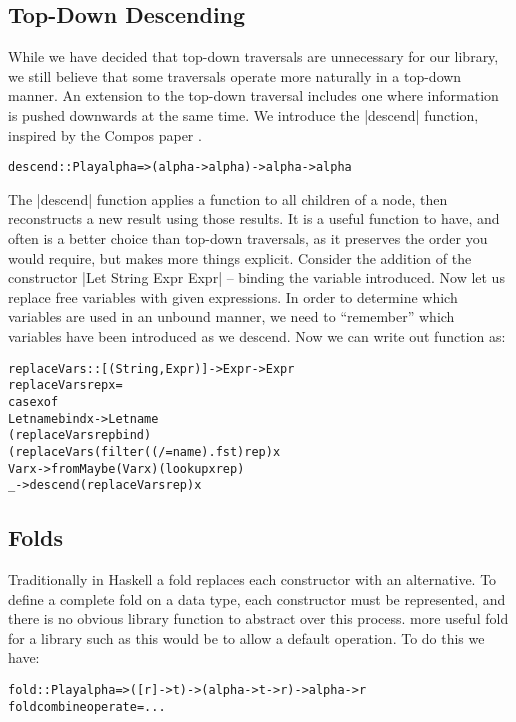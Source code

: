 \documentclass[preprint]{sigplanconf}
\newenvironment{code}{\begin{alltt}\small}{\end{alltt}}
\begin{document}
\subsection{Top-Down Descending}

While we have decided that top-down traversals are unnecessary for our library, we still believe that some traversals operate more naturally in a top-down manner. An extension to the top-down traversal includes one where information is pushed downwards at the same time. We introduce the |descend| function, inspired by the Compos paper \cite{compos}.

\begin{code}
descend :: Play alpha => (alpha -> alpha) -> alpha -> alpha
\end{code}

The |descend| function applies a function to all children of a node, then reconstructs a new result using those results. It is a useful function to have, and often is a better choice than top-down traversals, as it preserves the order you would require, but makes more things explicit. 
Consider the addition of the constructor |Let String Expr Expr| -- binding the variable introduced. Now let us replace free variables with given expressions. In order to determine which variables are used in an unbound manner, we need to ``remember'' which variables have been introduced as we descend. Now we can write out function as:

\begin{code}
replaceVars :: [(String,Expr)] -> Expr -> Expr
replaceVars rep x =
    case  x of
          Let name bind x -> Let name
              (replaceVars rep bind)
              (replaceVars (filter ((/= name) . fst) rep) x
          Var x -> fromMaybe (Var x) (lookup x rep)
          _ -> descend (replaceVars rep) x
\end{code}


\subsection{Folds}

Traditionally in Haskell a fold replaces each constructor with an alternative. To define a complete fold on a data type, each constructor must be represented, and there is no obvious library function to abstract over this process. more useful fold for a library such as this would be to allow a default operation. To do this we have:

\begin{code}
fold :: Play alpha => ([r] -> t) -> (alpha -> t -> r) -> alpha -> r
fold combine operate = ...
\end{code}
\end{document}
